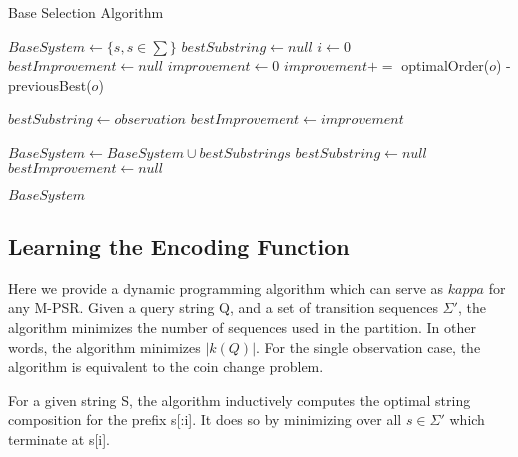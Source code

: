 \begin{algorithm}
\caption{Base Selection Algorithm}
\label{Base Selection}
\begin{algorithmic}[1]
\State $BaseSystem \gets \{s, s \in \sum \}$
\State $bestSubstring \gets null$
\State $i\gets 0$\
\State $bestImprovement \gets null$
		\State $improvement \gets 0$
			$improvement +=$ optimalOrder($o$) - previousBest($o$)
		\EndFor
		
			\State $bestSubstring \gets observation$
			\State $bestImprovement \gets improvement$
		\EndIf
		
	\EndFor

	\State $BaseSystem \gets BaseSystem \cup bestSubstrings$
	\State $bestSubstring \gets null$
	\State $bestImprovement \gets null$

\EndWhile
\Return $BaseSystem$
\EndProcedure
\end{algorithmic}
\end{algorithm}

\subsection{Learning the Encoding Function}

Here we provide a dynamic programming algorithm which can serve as $kappa$ for any M-PSR. Given a query string Q, and a set of transition sequences $\Sigma'$, the algorithm minimizes the number of sequences used in the partition. In other words, the algorithm minimizes $|k(Q)|$. For the single observation case, the algorithm is equivalent to the coin change problem.

For a given string S, the algorithm inductively computes the optimal string composition for the prefix s[:i]. It does so by minimizing over all $s \in \Sigma'$ which terminate at s[i].

